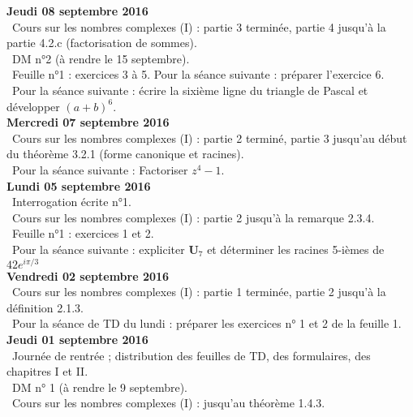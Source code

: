 \documentclass[12pt,a4paper]{article}
\begin{document}
\noindent\textbf{Jeudi 08 septembre 2016}\\
\bu\ Cours sur les nombres complexes (I) : partie 3 terminée, partie 4 jusqu'à la partie 4.2.c (factorisation de sommes).\\
\bu\ DM n°2 (à rendre le 15 septembre). \\
\bu\ Feuille n°1 : exercices 3 à 5. Pour la séance suivante : préparer l'exercice 6.\\
\bu\ Pour la séance suivante : écrire la sixième ligne du triangle de Pascal et développer $(a+b)^6$.\vspace{.4cm}\\

\noindent\textbf{Mercredi 07 septembre 2016}\\
\bu\ Cours sur les nombres complexes (I) : partie 2 terminé, partie 3 jusqu'au début du théorème 3.2.1 (forme canonique et racines).\\
\bu\ Pour la séance suivante : Factoriser $z^4-1$.\vspace{.4cm}\\

\noindent\textbf{Lundi 05 septembre 2016}\\
\bu\ Interrogation écrite n°1.\\
\bu\ Cours sur les nombres complexes (I) : partie 2 jusqu'à la remarque 2.3.4.\\
\bu\ Feuille n°1 : exercices 1 et 2.\\
\bu\ Pour la séance suivante : expliciter $\mathbf{U}_7$ et déterminer les racines 5-ièmes de $42 e^{i\pi/3}$\vspace{.4cm}\\

\noindent\textbf{Vendredi 02 septembre 2016}\\
\bu\ Cours sur les nombres complexes (I) : partie 1 terminée, partie 2 jusqu'à la définition 2.1.3.\\
\bu\ Pour la séance de TD du lundi : préparer les exercices n° 1 et 2 de la feuille 1. \vspace{.4cm}\\

\noindent\textbf{Jeudi 01 septembre 2016}\\
\bu\ Journée de rentrée ; distribution des feuilles de TD, des formulaires, des
chapitres I et II.  \\
\bu\ DM n° 1 (à
rendre le 9 septembre). \\
\bu\ Cours sur les nombres complexes (I) : jusqu'au théorème 1.4.3. 
\label{end}
\end{document}
